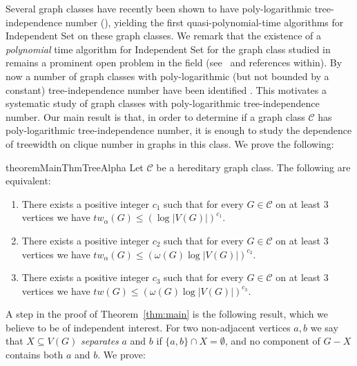 \documentclass[11pt]{amsart}
\newcommand{\tw}{tw\xspace}
\newcommand{\atw}{tw_{\alpha}\xspace}
\begin{document}
Several graph classes have recently been shown to have
poly-logarithmic tree-independence number (\cite{TI2,ChudnovskyGHLS25}), yielding the first quasi-polynomial-time algorithms for {\sc Independent Set} on these graph classes.  We remark that the existence of a {\em polynomial} time algorithm for {\sc Independent Set} for the graph class studied in \cite{ChudnovskyGHLS25} remains a prominent open problem in the field (see~\cite{ChudnovskyGHLS25} and references within). 
%
By now a number of graph classes with poly-logarithmic (but not bounded by a constant) tree-independence number have been identified 
\cite{mainconj, deathstar, awesomegraphparameters}. 
This motivates  a systematic study of graph classes with poly-logarithmic tree-independence number. Our main result is that, in order to determine if a graph class $\mathcal{C}$ has poly-logarithmic tree-independence number, it is enough to study 
the dependence of treewidth on clique number in graphs in this class.
We prove the following:

\begin{restatable}{theorem}{MainThmTreeAlpha}\label{thm:main}
    Let $\mathcal{C}$ be a hereditary graph class. The following are equivalent:
    \begin{enumerate}\setlength\itemsep{-.7pt}
        \item[(i)]\label{itm:atwbounded} There exists a positive integer $c_1$ such that for every $G \in \mathcal{C}$ on at least $3$ vertices we have $\atw(G) \leq (\log |V(G)|)^{c_1}$.
        \item[(ii)]\label{itm:atwcliquebounded} There exists a positive integer $c_2$ such that for every $G \in \mathcal{C}$ on at least $3$ vertices we have $\atw(G) \leq (\omega(G) \log |V(G)|)^{c_2}$.
        \item[(iii)]\label{itm:twcliquebounded} There exists a positive integer $c_3$ such that for every $G \in \mathcal{C}$ on at least $3$ vertices we have $\tw(G) \leq (\omega(G) \log |V(G)|)^{c_3}$.
    \end{enumerate}
\end{restatable}


A step in the proof of Theorem~\ref{thm:main} is the following result, which we believe to be of independent interest. For two non-adjacent vertices $a,b$
we say that $X \subseteq V(G)$ {\em separates} $a$ and $b$  if
$\{a,b\} \cap X = \emptyset$, and no component
of $G - X$ contains both $a$ and $b$. We prove:
\end{document}
